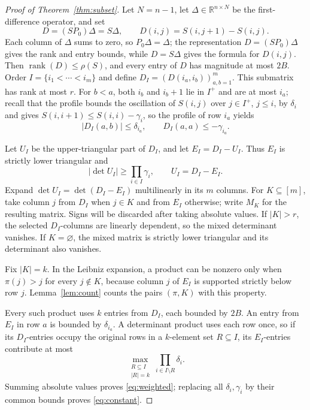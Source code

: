 \documentclass[10pt]{article} %
\theoremstyle{definition}
\DeclareMathOperator{\rank}{rank}
\newcommand{\R}{\mathbb R}
\begin{document}
\begin{proof}[Proof of Theorem~\ref{thm:subset}]
Let \(N=n-1\), let \(\Delta\in\R^{n\times N}\) be the first-difference
operator, and set
\[
 D=(SP_0)\Delta=S\Delta,
 \qquad D(i,j)=S(i,j+1)-S(i,j).
\]
Each column of \(\Delta\) sums to zero, so \(P_0\Delta=\Delta\); the
representation \(D=(SP_0)\Delta\) gives the rank and entry bounds, while
\(D=S\Delta\) gives the formula for \(D(i,j)\).
Then \(\rank(D)\le\rho(S)\), and every entry of \(D\) has magnitude at most
\(2B\).  Order \(I=\{i_1<\cdots<i_m\}\) and define
\(D_I=(D(i_a,i_b))_{a,b=1}^m\).  This submatrix has rank at most \(r\).
For \(b<a\), both \(i_b\) and \(i_b+1\) lie in \(I^+\) and are at most
\(i_a\); recall that the profile bounds the oscillation of \(S(i,j)\) over
\(j\in I^+\), \(j\le i\), by \(\delta_i\) and gives
\(S(i,i+1)\le S(i,i)-\gamma_i\), so the profile of row \(i_a\) yields
\[
 |D_I(a,b)|\le\delta_{i_a},
 \qquad D_I(a,a)\le-\gamma_{i_a}.
\]

Let \(U_I\) be the upper-triangular part of \(D_I\), and let
\(E_I=D_I-U_I\).  Thus \(E_I\) is strictly lower triangular and
\[
 |\det U_I|\ge\prod_{i\in I}\gamma_i,\qquad U_I=D_I-E_I.
\]
Expand \(\det U_I=\det(D_I-E_I)\) multilinearly in its \(m\) columns.  For
\(K\subseteq[m]\), take column \(j\) from \(D_I\) when \(j\in K\) and from
\(E_I\) otherwise; write \(M_K\) for the resulting matrix.  Signs will be
discarded after taking absolute values.
If \(|K|>r\), the selected \(D_I\)-columns are linearly dependent, so the
mixed determinant vanishes.  If \(K=\varnothing\), the mixed matrix is
strictly lower triangular and its determinant also vanishes.

Fix \(|K|=k\).  In the Leibniz expansion, a product can be nonzero only when
\(\pi(j)>j\) for every \(j\notin K\), because column \(j\) of \(E_I\) is
supported strictly below row \(j\).  Lemma~\ref{lem:count} counts the pairs
\((\pi,K)\) with this property.

Every such product uses \(k\) entries from \(D_I\), each bounded by \(2B\).
An entry from \(E_I\) in row \(a\) is bounded by \(\delta_{i_a}\).  A
determinant product uses each row once, so if its \(D_I\)-entries occupy the
original rows in a \(k\)-element set \(R\subseteq I\), its
\(E_I\)-entries contribute at most
\[
 \max_{\substack{R\subseteq I\\|R|=k}}
 \prod_{i\in I\setminus R}\delta_i .
\]
Summing absolute values proves \eqref{eq:weighted}; replacing all
\(\delta_i,\gamma_i\) by their common bounds proves
\eqref{eq:constant}.
\end{proof}
\end{document}
